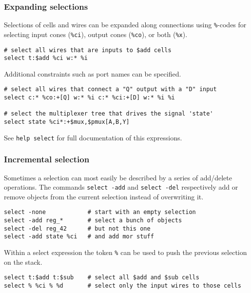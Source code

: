 \subsubsection{Expanding selections}

\begin{frame}[fragile]{\subsubsecname}
Selections of cells and wires can be expanded along connections using {\tt \%}-codes
for selecting input cones ({\tt \%ci}), output cones ({\tt \%co}), or both ({\tt \%x}).

\medskip
\begin{lstlisting}[xleftmargin=0.5cm, basicstyle=\ttfamily\fontsize{8pt}{10pt}\selectfont, language=ys]
# select all wires that are inputs to $add cells
select t:$add %ci w:* %i
\end{lstlisting}

\bigskip
Additional constraints such as port names can be specified.

\medskip
\begin{lstlisting}[xleftmargin=0.5cm, basicstyle=\ttfamily\fontsize{8pt}{10pt}\selectfont, language=ys]
# select all wires that connect a "Q" output with a "D" input
select c:* %co:+[Q] w:* %i c:* %ci:+[D] w:* %i %i

# select the multiplexer tree that drives the signal 'state'
select state %ci*:+$mux,$pmux[A,B,Y]
\end{lstlisting}

\bigskip
See {\tt help select} for full documentation of this expressions.
\end{frame}

\subsubsection{Incremental selection}

\begin{frame}[fragile]{\subsubsecname}
Sometimes a selection can most easily be described by a series of add/delete operations.
The commands {\tt select -add} and {\tt select -del} respectively add or remove objects
from the current selection instead of overwriting it.

\medskip
\begin{lstlisting}[xleftmargin=0.5cm, basicstyle=\ttfamily\fontsize{8pt}{10pt}\selectfont, language=ys]
select -none            # start with an empty selection
select -add reg_*       # select a bunch of objects
select -del reg_42      # but not this one
select -add state %ci   # and add mor stuff
\end{lstlisting}

\bigskip
Within a select expression the token {\tt \%} can be used to push the previous selection
on the stack.

\medskip
\begin{lstlisting}[xleftmargin=0.5cm, basicstyle=\ttfamily\fontsize{8pt}{10pt}\selectfont, language=ys]
select t:$add t:$sub    # select all $add and $sub cells
select % %ci % %d       # select only the input wires to those cells
\end{lstlisting}
\end{frame}

